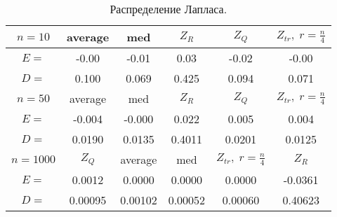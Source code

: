 \documentclass[a4]{article}
\begin{document}
		\begin{table}[h]
			\caption{ Распределение Лапласа.}
			\begin{center}
				\begin{tabular}{|c|c|c|c|c|c|}
					\hline
					$n = 10$    & average & med & $Z_R$ & $Z_Q$ & $Z_{tr},\;r=\frac{n}{4}$\\ \hline 
					$E = $    &  	-0.00    &    -0.01 &       0.03      &   -0.02      &  -0.00   \\ \hline
					$D = $     & 0.100      &   0.069        & 0.425      &   0.094       &  0.071    \\ \hline
					
					$n = 50$  & average & med & $Z_R$ & $Z_Q$ & $Z_{tr},\;r=\frac{n}{4}$\\ \hline
					$E = $     & -0.004       & -0.000       & 0.022 &         0.005 &         0.004   \\ \hline
					$D =$      & 	0.0190    &     0.0135  &       0.4011      &   0.0201      &   0.0125  \\ \hline
					
					$n = 1000$  & $Z_Q$ & average & med  & $Z_{tr},\;r=\frac{n}{4}$  & $Z_R$\\ \hline
					$E =$   &   0.0012   & 	0.0000    &     0.0000            &    0.0000  &       -0.0361   \\ \hline
					$D = $   &   0.00095  & 0.00102        & 0.00052                  &  0.00060  &  0.40623 \\ 
					\hline
				\end{tabular}
			\end{center}
		\end{table}
		
\end{document}
